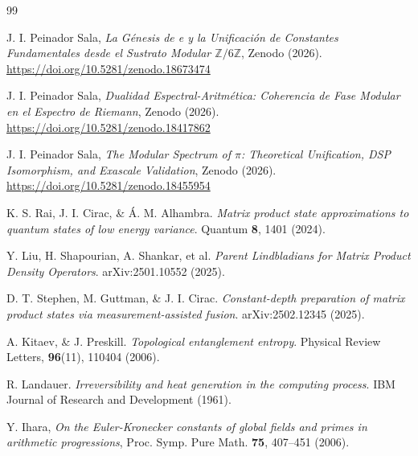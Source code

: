\documentclass[12pt,a4paper]{article}
\theoremstyle{plain}
\theoremstyle{definition}
\theoremstyle{remark}
\begin{document}
\begin{thebibliography}{99}

J. I. Peinador Sala, \textit{La Génesis de e y la Unificación de Constantes Fundamentales desde el Sustrato Modular $\mathbb{Z}/6\mathbb{Z}$}, Zenodo (2026). \url{https://doi.org/10.5281/zenodo.18673474}

J. I. Peinador Sala, \textit{Dualidad Espectral-Aritmética: Coherencia de Fase Modular en el Espectro de Riemann}, Zenodo (2026). \url{https://doi.org/10.5281/zenodo.18417862}

J. I. Peinador Sala, \textit{The Modular Spectrum of $\pi$: Theoretical Unification, DSP Isomorphism, and Exascale Validation}, Zenodo (2026). \url{https://doi.org/10.5281/zenodo.18455954}

K. S. Rai, J. I. Cirac, \& Á. M. Alhambra. \textit{Matrix product state approximations to quantum states of low energy variance}. Quantum \textbf{8}, 1401 (2024).

Y. Liu, H. Shapourian, A. Shankar, et al. \textit{Parent Lindbladians for Matrix Product Density Operators}. arXiv:2501.10552 (2025).

D. T. Stephen, M. Guttman, \& J. I. Cirac. \textit{Constant-depth preparation of matrix product states via measurement-assisted fusion}. arXiv:2502.12345 (2025).

A. Kitaev, \& J. Preskill. \textit{Topological entanglement entropy}. Physical Review Letters, \textbf{96}(11), 110404 (2006).

R. Landauer. \textit{Irreversibility and heat generation in the computing process}. IBM Journal of Research and Development (1961).

Y. Ihara, \textit{On the Euler-Kronecker constants of global fields and primes in arithmetic progressions}, Proc. Symp. Pure Math. \textbf{75}, 407–451 (2006).

\end{thebibliography}

\appendix
\end{document}
